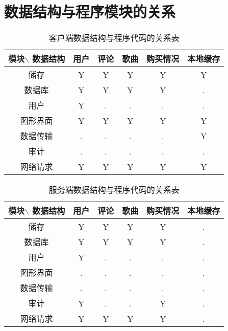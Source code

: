 \section{数据结构与程序模块的关系}
\begin{table}[htbp]
\centering
\caption{客户端数据结构与程序代码的关系表} \label{tab:datastructure-module-client}
\begin{tabular}{|c|c|c|c|c|c|}
    \hline
    模块$\backslash$ 数据结构 & 用户 & 评论 & 歌曲 & 购买情况 & 本地缓存 \\
    \hline
    储存 & Y & Y & Y & Y & Y \\
    \hline
    数据库 & Y & Y & Y & Y & . \\
    \hline
    用户 & Y & . & . & . & . \\
    \hline
    图形界面 & Y & Y & Y & Y & Y \\
    \hline
    数据传输 & . & . & . & . & Y \\
    \hline
    审计 & . & . & . & . & . \\
    \hline
    网络请求 & Y & Y & Y & Y & Y \\
    \hline
\end{tabular}
\end{table}

\begin{table}[htbp]
    \centering
    \caption{服务端数据结构与程序代码的关系表} \label{tab:datastructure-module-server}
    \begin{tabular}{|c|c|c|c|c|c|}
        \hline
        模块$\backslash$ 数据结构 & 用户 & 评论 & 歌曲 & 购买情况 & 本地缓存 \\
        \hline
        储存 & Y & Y & Y & Y & . \\
        \hline
        数据库 & Y & Y & Y & Y & . \\
        \hline
        用户 & Y & . & . & . & . \\
        \hline
        图形界面 & . & . & . & . & . \\
        \hline
        数据传输 & . & . & . & . & . \\
        \hline
        审计 & Y & . & . & Y & . \\
        \hline
        网络请求 & Y & Y & Y & Y & . \\
        \hline
    \end{tabular}
    \end{table}